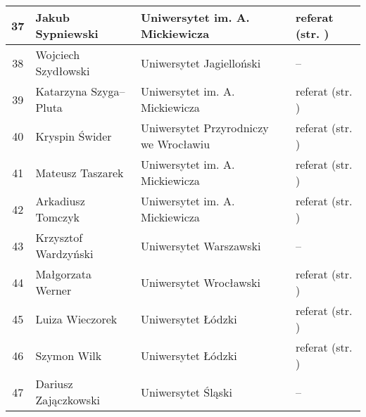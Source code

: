 \documentclass[12pt,oneside]{book}
\begin{document}
\begin{tabular}{||c|l|l|l||}
37	 & Jakub Sypniewski & Uniwersytet im. A. Mickiewicza & referat (str. \pageref{sypniewski}) \\\hline
38	 & Wojciech Szydłowski & Uniwersytet Jagielloński & -- \\\hline
39	 & Katarzyna Szyga--Pluta & Uniwersytet im. A. Mickiewicza & referat (str. \pageref{kendzierski}) \\\hline
40	 & Kryspin Świder & Uniwersytet Przyrodniczy we Wrocławiu & referat (str. \pageref{swider}) \\\hline
41	 & Mateusz Taszarek & Uniwersytet im. A. Mickiewicza & referat (str. \pageref{taszarek}) \\\hline
42	 & Arkadiusz Tomczyk & Uniwersytet im. A. Mickiewicza & referat (str. \pageref{kendzierski}) \\\hline
43	 & Krzysztof Wardzyński & Uniwersytet Warszawski & -- \\\hline
44   & Małgorzata Werner & Uniwersytet Wrocławski & referat (str. \pageref{bilinska})  \\\hline
45   & Luiza Wieczorek & Uniwersytet Łódzki & referat (str. \pageref{wieczorek}) \\\hline
46   & Szymon Wilk & Uniwersytet Łódzki & referat (str. \pageref{wilk}) \\\hline
47   & Dariusz Zajączkowski & Uniwersytet Śląski & -- \\\hline
	
\hline
\hline
\end{tabular}


\printindex[a]
%


\backmatter



%
\end{document}
